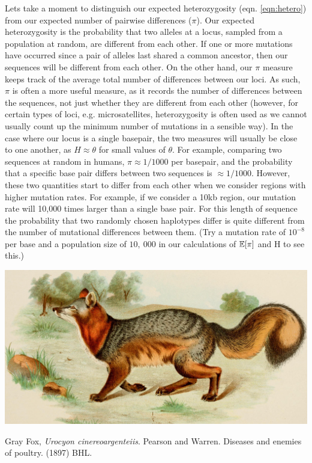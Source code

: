 Lets take a moment to distinguish our expected heterozygosity (eqn. \ref{eqn:hetero}) from our expected number of pairwise differences ($\pi$). Our expected heterozygosity is the probability that two alleles at a locus, sampled from a population at random, are different from each other. If one or more mutations have occurred since a pair of alleles last shared a common ancestor, then our sequences will be different from each other. On the other hand, our $\pi$ measure keeps track of the average total number of differences between our loci. As such, $\pi$ is often a more useful measure, as it records the number of differences between the sequences, not just whether they are different from each other (however, for certain types of loci, e.g. microsatellites, heterozygosity is often used as we cannot usually count up the minimum number of mutations in a sensible way). In the case where our locus is a single basepair, the two measures will usually be close to one another, as $H \approx \theta$ for small values of $\theta$. For example, comparing two sequences at random in humans, $\pi \approx 1/1000$ per basepair, and the probability that a specific base pair differs between two sequences is $\approx 1/1000$. However, these two quantities start to differ from each other when we consider regions with higher mutation rates. For example, if we consider a 10kb region, our mutation rate will 10,000 times larger than a single base pair. For this length of sequence the probability that two randomly chosen haplotypes differ is quite different from the number of mutational differences  between them. (Try a mutation rate of $10^{-8}$ per base and a population size of $10,~000$ in our calculations of $\mathbb{E}[\pi]$ and H to see this.)


\begin{marginfigure}
\begin{center}
  \includegraphics[width =
  \textwidth]{illustration_images/Quant_gen/Grey_fox/14770789583_4db7ec5164_o.jpg}  %
\end{center}
\caption{Gray Fox, {\it Urocyon cinereoargenteiis}. Pearson and Warren. Diseases and enemies of poultry. (1897) BHL.} 
\end{marginfigure}


